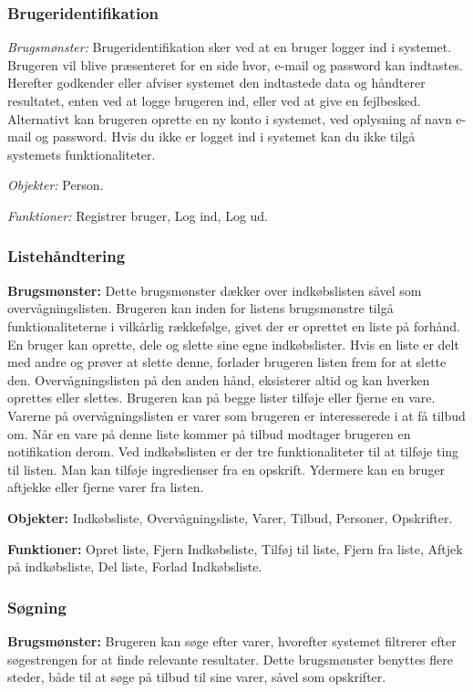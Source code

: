\subsubsection*{Brugeridentifikation}
\textit{Brugsmønster:} Brugeridentifikation sker ved at en bruger logger ind i systemet.
Brugeren vil blive præsenteret for en side hvor, e-mail og password kan indtastes.
Herefter godkender eller afviser systemet den indtastede data og håndterer resultatet, enten ved at logge brugeren ind, eller ved at give en fejlbesked.
Alternativt kan brugeren oprette en ny konto i systemet, ved oplysning af navn e-mail og password.
Hvis du ikke er logget ind i systemet kan du ikke tilgå systemets funktionaliteter.

\textit{Objekter:} Person.

\textit{Funktioner:} Registrer bruger, Log ind, Log ud.

\subsubsection*{Listehåndtering}
\textbf{Brugsmønster:} Dette brugsmønster dækker over indkøbslisten såvel som overvågningslisten.
Brugeren kan inden for listens brugsmønstre tilgå funktionaliteterne i vilkårlig rækkefølge, givet der er oprettet en liste på forhånd.
En bruger kan oprette, dele og slette sine egne indkøbslister.
Hvis en liste er delt med andre og prøver at slette denne, forlader brugeren listen frem for at slette den.
Overvågningslisten på den anden hånd, eksisterer altid og kan hverken oprettes eller slettes.
Brugeren kan på begge lister tilføje eller fjerne en vare.
Varerne på overvågningslisten er varer som brugeren er interesserede i at få tilbud om.
Når en vare på denne liste kommer på tilbud modtager brugeren en notifikation derom.
Ved indkøbslisten er der tre funktionaliteter til at tilføje ting til listen.
Man kan tilføje ingredienser fra en opskrift.
Ydermere kan en bruger aftjekke eller fjerne varer fra listen.

\textbf{Objekter:} Indkøbsliste, Overvågningsliste, Varer, Tilbud, Personer, Opskrifter.

\textbf{Funktioner:} Opret liste, Fjern Indkøbsliste, Tilføj til liste, Fjern fra liste, Aftjek på indkøbsliste, Del liste, Forlad Indkøbsliste.

\subsubsection*{Søgning}
\textbf{Brugsmønster:} Brugeren kan søge efter varer, hvorefter systemet filtrerer efter søgestrengen for at finde relevante resultater.
Dette brugsmønster benyttes flere steder, både til at søge på tilbud til sine varer, såvel som opskrifter.


